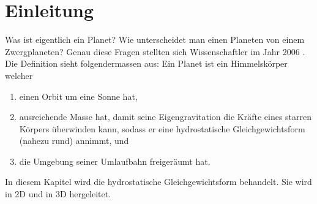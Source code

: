 %
%
%
%
\section{Einleitung\label{planet:section:einleitung}}
Was ist eigentlich ein Planet?
%
Wie unterscheidet man einen Planeten von einem Zwergplaneten?
%
Genau diese Fragen stellten sich Wissenschaftler im Jahr 2006 \cite{planet:iaub5}.
Die Definition sieht folgendermassen aus:
Ein Planet ist ein Himmelskörper welcher
\begin{enumerate}
	\item einen Orbit um eine Sonne hat,
%
	\item ausreichende Masse hat, damit seine Eigengravitation die Kräfte eines starren Körpers überwinden kann, sodass er eine hydrostatische Gleichgewichtsform (nahezu rund) annimmt, und
%
%
	\item die Umgebung seiner Umlaufbahn freigeräumt hat.
%
%
\end{enumerate}

\noindent
In diesem Kapitel wird die hydrostatische Gleichgewichtsform behandelt.
Sie wird in 2D und in 3D hergeleitet.


